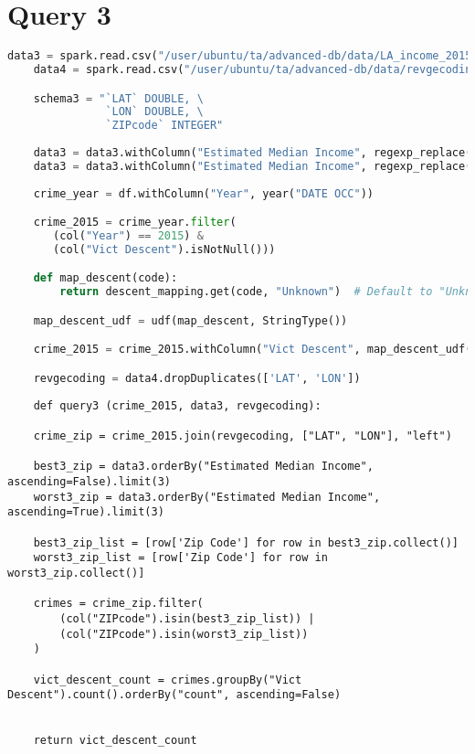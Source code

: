 \documentclass{article}
\begin{document}

\section*{Query 3}

\begin{lstlisting}[language = Python]
    data3 = spark.read.csv("/user/ubuntu/ta/advanced-db/data/LA_income_2015.csv", header=True, schema=schema2)
    data4 = spark.read.csv("/user/ubuntu/ta/advanced-db/data/revgecoding.csv", header=True, schema=schema3)

    schema3 = "`LAT` DOUBLE, \
               `LON` DOUBLE, \
               `ZIPcode` INTEGER"
    
    data3 = data3.withColumn("Estimated Median Income", regexp_replace(col("Estimated Median Income"), "\$", ""))
    data3 = data3.withColumn("Estimated Median Income", regexp_replace(col("Estimated Median Income"), ",", "").cast("float"))
     
    crime_year = df.withColumn("Year", year("DATE OCC"))

    crime_2015 = crime_year.filter(
       (col("Year") == 2015) & 
       (col("Vict Descent").isNotNull()))

    def map_descent(code):
        return descent_mapping.get(code, "Unknown")  # Default to "Unknown" if code not found

    map_descent_udf = udf(map_descent, StringType())

    crime_2015 = crime_2015.withColumn("Vict Descent", map_descent_udf(crime_2015["Vict Descent"]))

    revgecoding = data4.dropDuplicates(['LAT', 'LON'])
\end{lstlisting}

\begin{lstlisting}
    def query3 (crime_2015, data3, revgecoding):

    crime_zip = crime_2015.join(revgecoding, ["LAT", "LON"], "left")

    best3_zip = data3.orderBy("Estimated Median Income", ascending=False).limit(3)
    worst3_zip = data3.orderBy("Estimated Median Income", ascending=True).limit(3)
    
    best3_zip_list = [row['Zip Code'] for row in best3_zip.collect()] 
    worst3_zip_list = [row['Zip Code'] for row in worst3_zip.collect()]

    crimes = crime_zip.filter(
        (col("ZIPcode").isin(best3_zip_list)) | 
        (col("ZIPcode").isin(worst3_zip_list))
    )
    
    vict_descent_count = crimes.groupBy("Vict Descent").count().orderBy("count", ascending=False)


    return vict_descent_count
\end{lstlisting}
\end{document}

